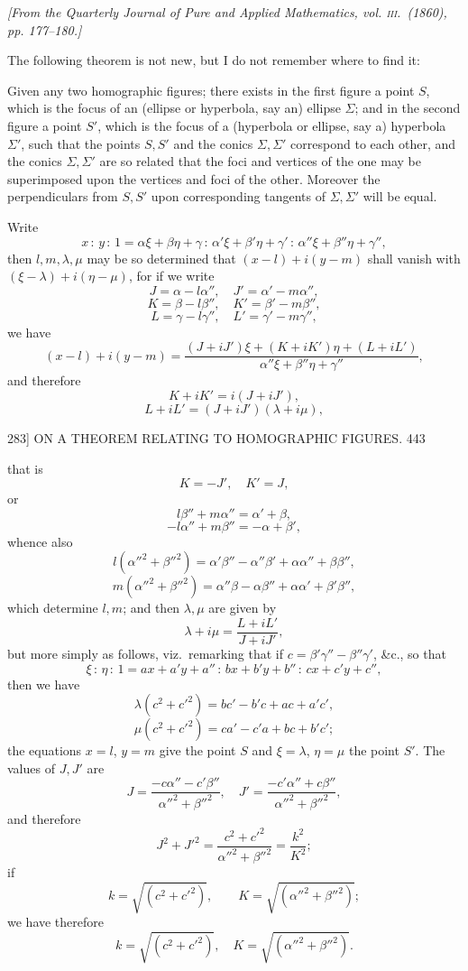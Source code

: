 \documentclass[11pt]{article}
\begin{document}
\begin{center}
\textit{[From the Quarterly Journal of Pure and Applied Mathematics, vol. \textsc{iii}.\ (1860),
pp. 177--180.]}
\end{center}

\medskip

The following theorem is not new, but I do not remember where to find it:

Given any two homographic figures; there exists in the first figure a point $S$,
which is the focus of an (ellipse or hyperbola, say an) ellipse $\Sigma$; and in the
second figure a point $S'$, which is the focus of a (hyperbola or ellipse, say a)
hyperbola $\Sigma'$, such that the points $S,S'$ and the conics $\Sigma,\Sigma'$
correspond to each other, and the conics $\Sigma,\Sigma'$ are so related that the
foci and vertices of the one may be superimposed upon the vertices and foci of the
other. Moreover the perpendiculars from $S,S'$ upon corresponding tangents of
$\Sigma,\Sigma'$ will be equal.

Write
\[ x\,:\,y\,:\,1=\alpha\xi+\beta\eta+\gamma\,:\,\alpha'\xi+\beta'\eta+\gamma'\,:\,\alpha''\xi+\beta''\eta+\gamma'', \]
then $l,m,\lambda,\mu$ may be so determined that $(x-l)+i(y-m)$ shall vanish with
$(\xi-\lambda)+i(\eta-\mu)$, for if we write
\[ J=\alpha-l\alpha'',\quad J'=\alpha'-m\alpha'', \]
\[ K=\beta-l\beta'',\quad K'=\beta'-m\beta'', \]
\[ L=\gamma-l\gamma'',\quad L'=\gamma'-m\gamma'', \]
we have
\[ (x-l)+i(y-m)=\dfrac{(J+iJ')\xi+(K+iK')\eta+(L+iL')}{\alpha''\xi+\beta''\eta+\gamma''}, \]
and therefore
\[ K+iK'=i(J+iJ'), \]
\[ L+iL'=(J+iJ')(\lambda+i\mu), \]

\begin{center}
\textsc{283]} \hfill ON A THEOREM RELATING TO HOMOGRAPHIC FIGURES. \hfill 443
\end{center}

that is
\[ K=-J',\quad K'=J, \]
or
\[ l\beta''+m\alpha''=\alpha'+\beta, \]
\[ -l\alpha''+m\beta''=-\alpha+\beta', \]
whence also
\[ l(\alpha''^{2}+\beta''^{2})=\alpha'\beta''-\alpha''\beta'+\alpha\alpha''+\beta\beta'', \]
\[ m(\alpha''^{2}+\beta''^{2})=\alpha''\beta-\alpha\beta''+\alpha\alpha'+\beta'\beta'', \]
which determine $l,m$; and then $\lambda,\mu$ are given by
\[ \lambda+i\mu=\dfrac{L+iL'}{J+iJ'}, \]
but more simply as follows, viz.\ remarking that if $c=\beta'\gamma''-\beta''\gamma'$,
\&c., so that
\[ \xi\,:\,\eta\,:\,1=ax+a'y+a''\,:\,bx+b'y+b''\,:\,cx+c'y+c'', \]
then we have
\[ \lambda(c^{2}+c'^{2})=bc'-b'c+ac+a'c', \]
\[ \mu(c^{2}+c'^{2})=ca'-c'a+bc+b'c'; \]
the equations $x=l$, $y=m$ give the point $S$ and $\xi=\lambda$, $\eta=\mu$ the
point $S'$. The values of $J,J'$ are
\[ J=\dfrac{-c\alpha''-c'\beta''}{\alpha''^{2}+\beta''^{2}},\quad J'=\dfrac{-c'\alpha''+c\beta''}{\alpha''^{2}+\beta''^{2}}, \]
and therefore
\[ J^{2}+J'^{2}=\dfrac{c^{2}+c'^{2}}{\alpha''^{2}+\beta''^{2}}=\dfrac{k^{2}}{K^{2}}; \]
if
\[ k=\sqrt{(c^{2}+c'^{2})},\qquad K=\sqrt{(\alpha''^{2}+\beta''^{2})}; \]
we have therefore
\[ k=\sqrt{(c^{2}+c'^{2})},\quad K=\sqrt{(\alpha''^{2}+\beta''^{2})}. \]
\end{document}

